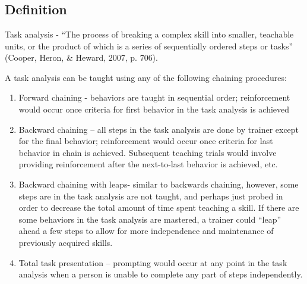 \section{\fourdSeven{}}
\subsection{Definition}
Task analysis - ``The process of breaking a complex skill into smaller, teachable units, or the product of which is a series of sequentially ordered steps or tasks'' (Cooper, Heron, \& Heward, 2007, p. 706).

A task analysis can be taught using any of the following chaining procedures:
\begin{enumerate}
\item Forward chaining -  behaviors are taught in sequential order; reinforcement would occur once criteria for first behavior in the task analysis is achieved
\item Backward chaining – all steps in the task analysis are done by trainer except for the final behavior; reinforcement would occur once criteria for last behavior in chain is achieved.  Subsequent teaching trials would involve providing reinforcement after the next-to-last behavior is achieved, etc.
\item  Backward chaining with leaps- similar to backwards chaining, however, some steps are in the task analysis are not taught, and perhaps just probed in order to decrease the total amount of time spent teaching a skill.  If there are some behaviors in the task analysis are mastered, a trainer could ``leap'' ahead a few steps to allow for more independence and maintenance of previously acquired skills.
\item Total task presentation – prompting would occur at any point in the task analysis when a person is unable to complete any part of steps independently.
\end{enumerate}
%
